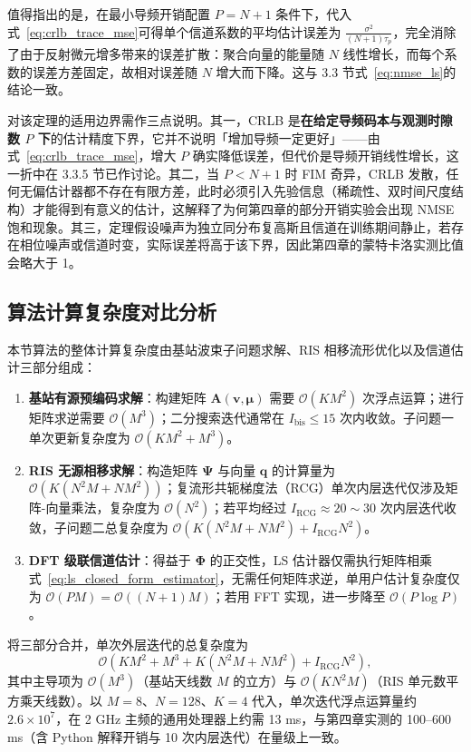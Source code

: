 值得指出的是，在最小导频开销配置 $P = N+1$ 条件下，代入式~\eqref{eq:crlb_trace_mse}可得单个信道系数的平均估计误差为 $\frac{\sigma^2}{(N+1)\tau_p}$，完全消除了由于反射微元增多带来的误差扩散：聚合向量的能量随 $N$ 线性增长，而每个系数的误差方差固定，故相对误差随 $N$ 增大而下降。这与 3.3 节式~\eqref{eq:nmse_ls}的结论一致。

对该定理的适用边界需作三点说明。其一，CRLB 是\textbf{在给定导频码本与观测时隙数 $P$ 下}的估计精度下界，它并不说明「增加导频一定更好」——由式~\eqref{eq:crlb_trace_mse}，增大 $P$ 确实降低误差，但代价是导频开销线性增长，这一折中在 3.3.5 节已作讨论。其二，当 $P < N+1$ 时 FIM 奇异，CRLB 发散，任何无偏估计器都不存在有限方差，此时必须引入先验信息（稀疏性、双时间尺度结构）才能得到有意义的估计，这解释了为何第四章的部分开销实验会出现 NMSE 饱和现象。其三，定理假设噪声为独立同分布复高斯且信道在训练期间静止，若存在相位噪声或信道时变，实际误差将高于该下界，因此第四章的蒙特卡洛实测比值会略大于 1。

\subsection{算法计算复杂度对比分析}
\label{sec:complexity}

本节算法的整体计算复杂度由基站波束子问题求解、RIS 相移流形优化以及信道估计三部分组成：
\begin{enumerate}
  \item \textbf{基站有源预编码求解}：构建矩阵 $\bm{A}(\bm{v}, \bm{\mu})$ 需要 $\mathcal{O}(KM^2)$ 次浮点运算；进行矩阵求逆需要 $\mathcal{O}(M^3)$；二分搜索迭代通常在 $I_{\mathrm{bis}} \le 15$ 次内收敛。子问题一单次更新复杂度为 $\mathcal{O}(KM^2 + M^3)$。
  \item \textbf{RIS 无源相移求解}：构造矩阵 $\bm{\Psi}$ 与向量 $\bm{q}$ 的计算量为 $\mathcal{O}(K(N^2M + NM^2))$；复流形共轭梯度法（RCG）单次内层迭代仅涉及矩阵-向量乘法，复杂度为 $\mathcal{O}(N^2)$；若平均经过 $I_{\mathrm{RCG}} \approx 20\sim 30$ 次内层迭代收敛，子问题二总复杂度为 $\mathcal{O}(K(N^2M + NM^2) + I_{\mathrm{RCG}} N^2)$。
  \item \textbf{DFT 级联信道估计}：得益于 $\bm{\Phi}$ 的正交性，LS 估计器仅需执行矩阵相乘式~\eqref{eq:ls_closed_form_estimator}，无需任何矩阵求逆，单用户估计复杂度仅为 $\mathcal{O}(PM) = \mathcal{O}((N+1)M)$；若用 FFT 实现，进一步降至 $\mathcal{O}(P\log P)$。
\end{enumerate}

将三部分合并，单次外层迭代的总复杂度为
\begin{equation}
  \mathcal{O}\left( KM^2 + M^3 + K(N^2M + NM^2) + I_{\mathrm{RCG}}N^2 \right),
  \label{eq:complexity_total}
\end{equation}
其中主导项为 $\mathcal{O}(M^3)$（基站天线数 $M$ 的立方）与 $\mathcal{O}(KN^2M)$（RIS 单元数平方乘天线数）。以 $M = 8$、$N = 128$、$K = 4$ 代入，单次迭代浮点运算量约 $2.6\times 10^{7}$，在 2 GHz 主频的通用处理器上约需 13 ms，与第四章实测的 100–600 ms（含 Python 解释开销与 10 次内层迭代）在量级上一致。


